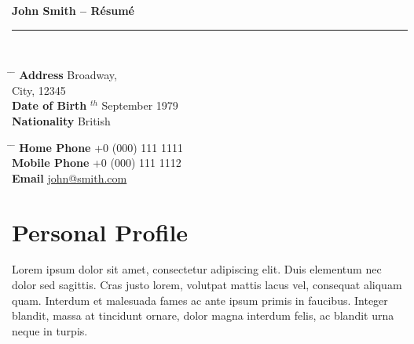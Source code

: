 \documentclass[10pt]{article} %
\renewcommand{\title}[1]{
{\huge{\color{headercolor}\textbf{#1}}}\\
\rule{\textwidth}{0.5mm}\\
}
\begin{document}

\title{John Smith -- Résumé} %


\parbox[t]{0.5\textwidth}{
\begin{tabbing}
\hspace{3cm} \= \hspace{4cm} \= \kill
{\bf Address}  Broadway,\\
\> City, 12345 \\[3pt]
{\bf Date of Birth} $^{th}$ September 1979 \\[5pt]
{\bf Nationality} \> British
\end{tabbing}}
%
\hfill
%
\parbox[t]{0.5\textwidth}{
\begin{tabbing}
\hspace{3cm} \= \hspace{4cm} \= \kill
{\bf Home Phone} \> +0 (000) 111 1111 \\[5pt]
{\bf Mobile Phone} \> +0 (000) 111 1112 \\[5pt]
{\bf Email} \> \href{mailto:john@smith.com}{john@smith.com}\\
\end{tabbing}}


\section{Personal Profile}

Lorem ipsum dolor sit amet, consectetur adipiscing elit. Duis elementum nec dolor sed sagittis. Cras justo lorem, volutpat mattis lacus vel, consequat aliquam quam. Interdum et malesuada fames ac ante ipsum primis in faucibus. Integer blandit, massa at tincidunt ornare, dolor magna interdum felis, ac blandit urna neque in turpis.

\end{document}
